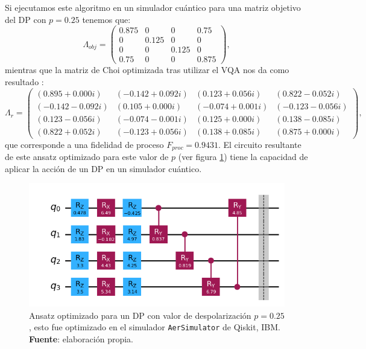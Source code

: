 \documentclass[letterpaper,12pt]{thesisECFM}
\theoremstyle{plain}
\theoremstyle{definition}
\theoremstyle{definition}
\theoremstyle{remark}
\newcommand{\1}{\mathbb{1}}
\begin{document}
Si ejecutamos este algoritmo en un simulador cuántico para una matriz objetivo del DP con $p=0.25$ tenemos que:
\begin{equation}
    \Lambda_{obj} = \begin{pmatrix}
0.875 & 0 & 0 & 0.75 \\
0 & 0.125 & 0 & 0 \\
0 & 0 & 0.125 & 0 \\
0.75 & 0 & 0 & 0.875
\end{pmatrix},
\end{equation}
mientras que la matriz de Choi optimizada tras utilizar el VQA nos da como
resultado : 
\begin{equation}
  \Lambda_r =  \begin{pmatrix}
(0.895+0.000i) & (-0.142+0.092i) & (0.123+0.056i) & (0.822-0.052i) \\
(-0.142-0.092i) & (0.105+0.000i) & (-0.074+0.001i) & (-0.123-0.056i) \\
(0.123-0.056i) & (-0.074-0.001i) & (0.125+0.000i) & (0.138-0.085i) \\
(0.822+0.052i) & (-0.123+0.056i) & (0.138+0.085i) & (0.875+0.000i)
\end{pmatrix},
\end{equation}
que corresponde a una fidelidad de proceso $F_{proc}= 0.9431$. El
circuito resultante de este ansatz optimizado para este valor de $p$ (ver
figura \ref{fig:ansatz_p025}) tiene la capacidad de aplicar la acción de un DP
en un simulador cuántico.  \begin{figure}[h!] 
    \centering 
    \includegraphics[width=0.70\linewidth]{imagenes/ansatz_p025.png}
    \caption{Ansatz optimizado para un DP con valor de despolarización $p=0.25$, esto fue optimizado en el simulador \texttt{AerSimulator} de Qiskit, IBM. \textbf{Fuente}: elaboración propia. }
    \label{fig:ansatz_p025}
    \end{figure}

\end{document}
